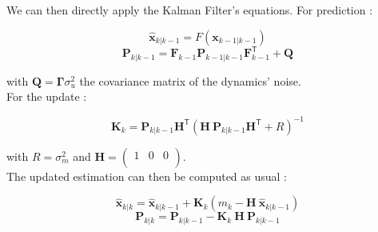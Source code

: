 \documentclass[english, DIV=13]{scrartcl}
\renewcommand{\vec}[1]{\mathbf{#1}}
\begin{document}
We can then directly apply the Kalman Filter's equations. For prediction :


\[ \vec{\hat{x}}_{k|k-1} = F(\vec{x}_{k-1|k-1}) \]
\[ \vec{P}_{k|k-1} = \vec{F}_{k-1} \vec{P}_{k-1|k-1} \vec{F}_{k-1}^\mathsf{T} + \vec{Q} \]

with $\vec{Q} = \vec{\Gamma} \sigma_u^2$ the covariance matrix of the dynamics' noise.\\
For the update :

\[ \vec{K}_k = \vec{P}_{k|k-1} \vec{H}^\mathsf{T} (\vec{H} ~ \vec{P}_{k|k-1} \vec{H}^\mathsf{T} + R)^{-1} \]

with $R = \sigma_m^2$ and $\vec{H} = 
    \begin{pmatrix}
        1 & 0 & 0 \\
    \end{pmatrix}
$.\\
The updated estimation can then be computed as usual :


\[ \vec{\hat{x}}_{k|k} = \vec{\hat{x}}_{k|k-1} + \vec{K}_k (m_k  - \vec{H} ~ \vec{\hat{x}}_{k|k-1}) \]
\[ \vec{P}_{k|k} = \vec{P}_{k|k-1} - \vec{K}_k ~ \vec{H} ~ \vec{P}_{k|k-1} \]
\end{document}
